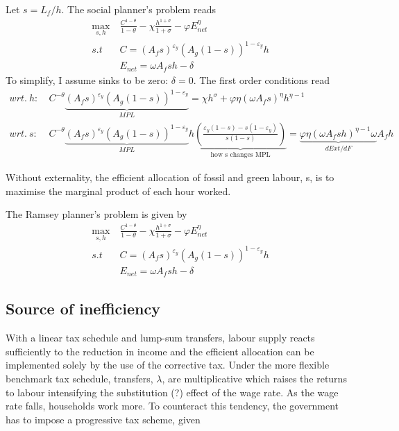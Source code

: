 Let $s=L_f/h$. The social planner's problem reads
\begin{align}
\underset{s, h}{\max}\ & \frac{C^{1-\theta}}{1-\theta}-\chi \frac{h^{1+\sigma}}{1+\sigma}-\varphi E_{net}^{\eta}\\
s.t\ \ & C=\left(A_fs\right)^{\varepsilon_y}\left(A_g(1-s)\right)^{1-\varepsilon_y}h\\
& E_{net}=\omega A_fsh-\delta
\end{align}
To simplify, I assume sinks to be zero: $\delta=0$.
The first order conditions read
\begin{align}
wrt.\ h:\ & C^{-\theta}\underbrace{(A_fs)^{\varepsilon_y}(A_g(1-s))^{1-\varepsilon_y}}_{MPL}=\chi h^\sigma+\varphi \eta (\omega A_f s)^\eta h^{\eta-1}\\
wrt.\ s:\ & C^{-\theta}\underbrace{(A_fs)^{\varepsilon_y}(A_g(1-s))^{1-\varepsilon_y}}_{MPL}h\underbrace{\left(\frac{\varepsilon_y(1-s)-s(1-\varepsilon_y)}{s(1-s)}\right)}_{\text{how s changes MPL}}=\underbrace{\varphi \eta (\omega A_f s h)^{\eta-1}\omega }_{dExt/dF} A_f h
\end{align}

Without externality, the efficient allocation of fossil and green labour, s, is to maximise the marginal product of each hour worked.

The Ramsey planner's problem is given by
\begin{align}
\underset{s, h}{\max}\ & \frac{C^{1-\theta}}{1-\theta}-\chi \frac{h^{1+\sigma}}{1+\sigma}-\varphi E_{net}^{\eta}\\
s.t\ \ & C=\left(A_fs\right)^{\varepsilon_y}\left(A_g(1-s)\right)^{1-\varepsilon_y}h\\
& E_{net}=\omega A_fsh-\delta
\end{align}

\subsection{Source of inefficiency}
With a linear tax schedule and lump-sum transfers, labour supply reacts sufficiently to the reduction in income and the efficient allocation can be implemented solely by the use of the corrective tax. Under the more flexible benchmark tax schedule, transfers, $\lambda$, are multiplicative which raises the returns to labour intensifying the substitution (?) effect of the wage rate. As the wage rate falls, households work more. To counteract this tendency, the government has to impose a progressive tax scheme, given